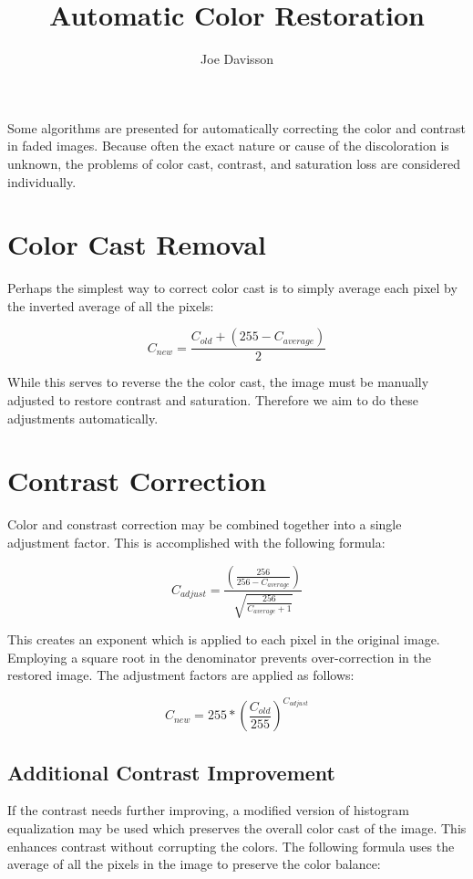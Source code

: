 \documentclass{article}
\title{Automatic Color Restoration}
\author{Joe Davisson} %
\begin{document}
\maketitle

Some algorithms are presented for automatically correcting the
color and contrast in faded images. Because often the exact nature or cause
of the discoloration is unknown, the problems of color cast, contrast, and
saturation loss are considered individually.

\section{Color Cast Removal}
Perhaps the simplest way to correct color cast is to simply average each
pixel by the inverted average of all the pixels:

\[ C_{new} = \frac{C_{old} + \left(255 - C_{average}\right) }{2} \]

While this serves to reverse the the color cast, the image must be manually
adjusted to restore contrast and saturation. Therefore we aim to do these
adjustments automatically.

\section{Contrast Correction}
Color and constrast correction may be combined together into a single
adjustment factor. This is accomplished with the following formula:

\[ C_{adjust} = \frac{\left(\frac{256} {256 - C_{average}}\right)}
                     {\sqrt{\frac{256} { C_{average} + 1}}} \]

This creates an exponent which is applied to each pixel in the original image. Employing a square root in the denominator prevents over-correction in the restored image. The adjustment factors are applied as follows:

\[ C_{new} = 255 * \left(\frac{C_{old}}{255}\right) ^ {C_{adjust}} \]

\subsection{Additional Contrast Improvement}
If the contrast needs further improving, a modified version of histogram
equalization may be used which preserves the overall color cast of the image.
This enhances contrast without corrupting the colors. The following formula
uses the average of all the pixels in the image to preserve the color balance: 
\end{document}
